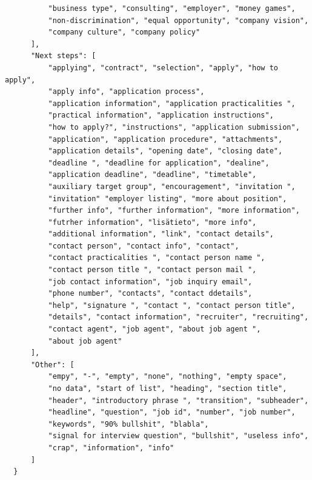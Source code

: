 \begin{verbatim}
          "business type", "consulting", "employer", "money games",
          "non-discrimination", "equal opportunity", "company vision",
          "company culture", "company policy"
      ],
      "Next steps": [
          "applying", "contract", "selection", "apply", "how to apply",
          "apply info", "application process",
          "application information", "application practicalities ",
          "practical information", "application instructions",
          "how to apply?", "instructions", "application submission",
          "application", "application procedure", "attachments",
          "application details", "opening date", "closing date",
          "deadline ", "deadline for application", "dealine",
          "application deadline", "deadline", "timetable",
          "auxiliary target group", "encouragement", "invitation ",
          "invitation" "employer listing", "more about position",
          "further info", "further information", "more information",
          "futrher information", "lisätieto", "more info",
          "additional information", "link", "contact details",
          "contact person", "contact info", "contact",
          "contact practicalities ", "contact person name ",
          "contact person title ", "contact person mail ",
          "job contact information", "job inquiry email",
          "phone number", "contacts", "contact ddetails",
          "help", "signature ", "contact ", "contact person title",
          "details", "contact information", "recruiter", "recruiting",
          "contact agent", "job agent", "about job agent ",
          "about job agent"
      ],
      "Other": [
          "empy", "-", "empty", "none", "nothing", "empty space",
          "no data", "start of list", "heading", "section title",
          "header", "introductory phrase ", "transition", "subheader",
          "headline", "question", "job id", "number", "job number",
          "keywords", "90% bullshit", "blabla",
          "signal for interview question", "bullshit", "useless info",
          "crap", "information", "info"
      ]
  }
\end{verbatim}
